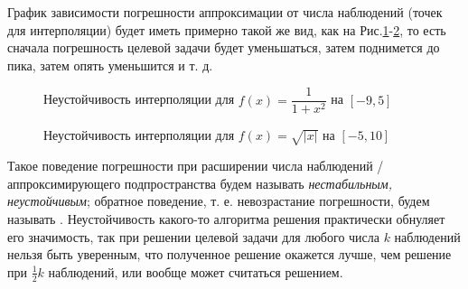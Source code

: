 \documentclass[a4paper, 12pt]{article}
\begin{document}
График зависимости погрешности аппроксимации от числа наблюдений (точек для интерполяции) будет иметь примерно такой же вид, как на Рис.\ref{runge1}-\ref{runge2}, то есть
сначала погрешность целевой задачи будет уменьшаться, затем поднимется до пика, затем опять уменьшится и т. д.

\begin{figure}[!h]
  \noindent{}
  \caption{Неустойчивость интерполяции для $f(x)=\dfrac{1}{1+x^2}$ на $[-9,5]$}
  \label{runge1}
\end{figure}
\begin{figure}[!h]
  \noindent{}
  \caption{Неустойчивость интерполяции для $f(x)=\sqrt{|x|}$ на $[-5,10]$}
  \label{runge2}
\end{figure}

Такое поведение погрешности при расширении числа наблюдений / аппроксимирующего подпространства будем называть {\it нестабильным, неустойчивым}; обратное поведение, т. е. невозрастание погрешности, будем называть {}.
Неустойчивость какого-то алгоритма решения практически обнуляет его значимость,
так при решении целевой задачи для любого числа $k$ наблюдений нельзя быть уверенным, что полученное решение окажется лучше, чем решение при $\frac{1}{2}k$ наблюдений, или вообще может считаться решением.    
\end{document}
